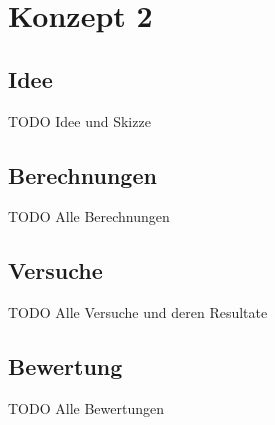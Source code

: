 \section{Konzept 2}

\subsection{Idee}
TODO Idee und Skizze

\subsection{Berechnungen}
TODO Alle Berechnungen

\subsection{Versuche}
TODO Alle Versuche und deren Resultate

\subsection{Bewertung}
TODO Alle Bewertungen